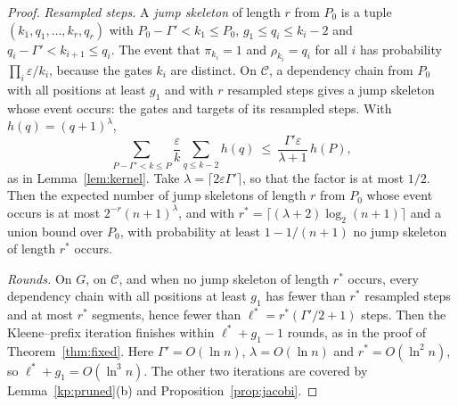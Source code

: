 \documentclass[11pt]{amsart}
\theoremstyle{definition}
\theoremstyle{remark}
\newcommand{\eps}{\varepsilon}
\begin{document}
\begin{proof}
\emph{Resampled steps.} A \emph{jump skeleton} of length $r$ from $P_0$ is a tuple
$(k_1,q_1,\dots,k_r,q_r)$ with $P_0-\Gamma'<k_1\le P_0$, $g_1\le q_i\le k_i-2$ and
$q_i-\Gamma'<k_{i+1}\le q_i$. The event that $\pi_{k_i}=1$ and $\rho_{k_i}=q_i$ for all $i$ has
probability $\prod_i\eps/k_i$, because the gates $k_i$ are distinct. On $\mathcal C$, a dependency
chain from $P_0$ with all positions at least $g_1$ and with $r$ resampled steps gives a jump
skeleton whose event occurs: the gates and targets of its resampled steps. With
$h(q)=(q+1)^\lambda$,
\[
\sum_{P-\Gamma'<k\le P}\frac{\eps}{k}\sum_{q\le k-2}h(q)\ \le\ \frac{\Gamma'\eps}{\lambda+1}\,h(P),
\]
as in Lemma~\ref{lem:kernel}. Take $\lambda=\lceil2\eps\Gamma'\rceil$, so that the factor is at
most $1/2$. Then the expected number of jump skeletons of length $r$ from $P_0$ whose event occurs
is at most $2^{-r}(n+1)^\lambda$, and with $r^*=\lceil(\lambda+2)\log_2(n+1)\rceil$ and a union
bound over $P_0$, with probability at least $1-1/(n+1)$ no jump skeleton of length $r^*$ occurs.

\emph{Rounds.} On $G$, on $\mathcal C$, and when no jump skeleton of length $r^*$ occurs, every
dependency chain with all positions at least $g_1$ has fewer than $r^*$ resampled steps and at
most $r^*$ segments, hence fewer than $\ell^*=r^*(\Gamma'/2+1)$ steps. Then the Kleene--prefix
iteration finishes within $\ell^*+g_1-1$ rounds, as in the proof of Theorem~\ref{thm:fixed}. Here
$\Gamma'=O(\ln n)$, $\lambda=O(\ln n)$ and $r^*=O(\ln^2n)$, so $\ell^*+g_1=O(\ln^3n)$. The other two
iterations are covered by Lemma~\ref{kp:pruned}(b) and Proposition~\ref{prop:jacobi}.
\end{proof}
\end{document}

